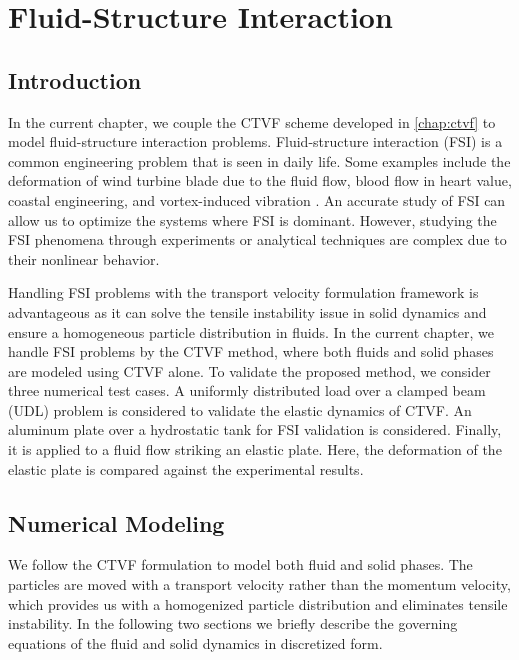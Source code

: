 \chapter{Fluid-Structure Interaction}\label{chap:fsi}
\section{Introduction}
In the current chapter, we couple the CTVF scheme developed in \cref{chap:ctvf}
to model fluid-structure interaction problems. Fluid-structure interaction (FSI)
is a common engineering problem that is seen in daily life. Some examples
include the deformation of wind turbine blade due to the fluid flow, blood flow
in heart value, coastal engineering, and vortex-induced vibration
\parencite{williamson2004vortex,bearman2011circular}. An accurate study of FSI can
allow us to optimize the systems where FSI is dominant. However, studying the
FSI phenomena through experiments or analytical techniques are complex due to
their nonlinear behavior.

Handling FSI problems with the transport velocity formulation framework is
advantageous as it can solve the tensile instability issue in solid dynamics and
ensure a homogeneous particle distribution in fluids. In the current chapter, we handle
FSI problems by the CTVF method, where both fluids and solid phases are modeled
using CTVF alone. To validate the proposed method, we consider three numerical
test cases. A uniformly distributed load over a clamped beam (UDL) problem is
considered to validate the elastic dynamics of CTVF. An aluminum plate over a
hydrostatic tank for FSI validation is considered. Finally, it is applied to a
fluid flow striking an elastic plate. Here, the deformation of the elastic plate
is compared against the experimental results.

\section{Numerical Modeling}\label{sec2}
We follow the CTVF formulation to model both fluid and solid phases. The
particles are moved with a transport velocity rather than the momentum velocity,
which provides us with a homogenized particle distribution and eliminates
tensile instability. In the following two sections we briefly describe the
governing equations of the fluid and solid dynamics in discretized form.


